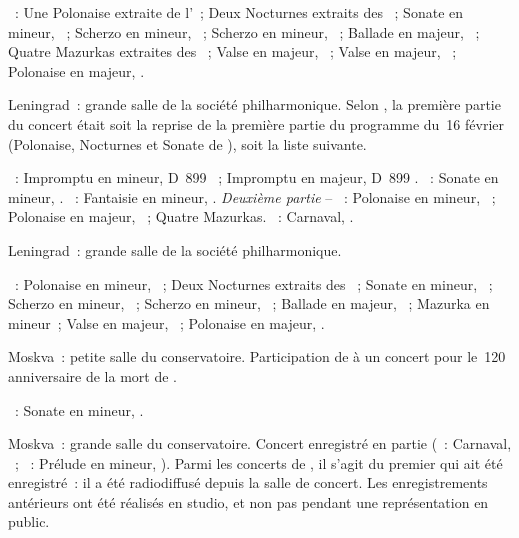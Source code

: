 \begin{description}
 \textsc{\Chopin{}}~: Une Polonaise extraite de l'~; Deux Nocturnes
 extraits des ~; Sonate en \kB \Flat mineur, ~;
 Scherzo en \kB mineur, ~; Scherzo en \kB \Flat mineur, ~;
 Ballade en \kA \Flat majeur, ~; Quatre Mazurkas extraites des
 ~; Valse  en \kD \Flat majeur, 
 ~; Valse  en \kA \Flat majeur,  ~;
 Polonaise en \kA \Flat majeur, .
 \item[\DateWithWeekDay{1947-02-19}]
 Leningrad~: grande salle de la société philharmonique.
 Selon \ASofronitsky{}, la première partie du concert était soit la reprise
 de la première partie du programme du~16 février (Polonaise, Nocturnes et
 Sonate de \Chopin{}), soit la liste suivante.

 \textsc{\Schubert{}}~: Impromptu en \kC mineur, D~899 ~;
 Impromptu en \kA \Flat majeur, D~899 .
 \textsc{\Beethoven{}}~: Sonate en \kC \Sharp mineur,  .
 \textsc{\Chopin{}}~: Fantaisie en \kF mineur, .
 \emph{Deuxième partie} -- \textsc{\Chopin{}}~: Polonaise en \kC \Sharp
 mineur,  ~; Polonaise en \kA majeur, 
 ~; Quatre Mazurkas.
 \textsc{\Schumann{}}~: Carnaval, .
 \item[\DateWithWeekDay{1947-02-23}]
 Leningrad~: grande salle de la société philharmonique.

 \textsc{\Chopin{}}~: Polonaise en \kC mineur,  ~; Deux
 Nocturnes extraits des ~; Sonate en \kB mineur, ~;
 Scherzo en \kB mineur, ~; Scherzo en \kB \Flat mineur, ~;
 Ballade en \kA \Flat majeur, ~; Mazurka en \kC \Sharp mineur~;
 Valse  en \kA \Flat majeur,  ~; Polonaise en
 \kA \Flat majeur, .
 \item[\DateWithWeekDay{1947-03-01}]
 Moskva~: petite salle du conservatoire.
 Participation de \VSofronitsky{} à un concert pour le~120\ieme{}
 anniversaire de la mort de \Beethoven{}.

 \textsc{\Beethoven{}}~: Sonate en \kC \Sharp mineur,  .
 \item[\DateWithWeekDay{1947-03-04}]
 Moskva~: grande salle du conservatoire.
 Concert enregistré en partie (\Schumann{}~: Carnaval, ~;
 \Scriabine{}~: Prélude en \kB mineur,  ).
 Parmi les concerts de \VSofronitsky{}, il s'agit du premier qui ait été
 enregistré~: il a été radiodiffusé depuis la salle de concert.
 Les enregistrements antérieurs ont été réalisés en studio, et non pas
 pendant une représentation en public.


\end{description}
